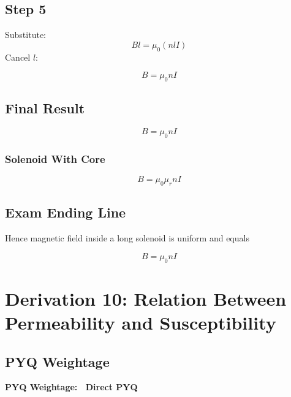 \documentclass[11pt,a4paper]{article}
\begin{document}
\subsection*{Step 5}
Substitute:
\[ Bl = \mu_0(nlI) \]
Cancel \( l \):
\begin{tcolorbox}[colback=RoyalBlue!5!white, colframe=RoyalBlue]
    \[ B = \mu_0 nI \]
\end{tcolorbox}

\subsection*{Final Result}
\begin{tcolorbox}[colback=RoyalBlue!5!white, colframe=RoyalBlue]
    \[ B = \mu_0 nI \]
\end{tcolorbox}

\subsubsection*{Solenoid With Core}
\begin{tcolorbox}[colback=RoyalBlue!5!white, colframe=RoyalBlue]
    \[ B = \mu_0 \mu_r nI \]
\end{tcolorbox}

\subsection*{Exam Ending Line}
Hence magnetic field inside a long solenoid is uniform and equals
\begin{tcolorbox}[colback=RoyalBlue!5!white, colframe=RoyalBlue]
    \[ B = \mu_0 nI \]
\end{tcolorbox}

\newpage

\section{Derivation 10: Relation Between Permeability and Susceptibility}

\subsection*{PYQ Weightage}
\begin{tcolorbox}[colback=yellow!10!white, colframe=orange, halign=center]
    \textbf{PYQ Weightage: \textasteriskcentered\textasteriskcentered\textasteriskcentered\textasteriskcentered\ Direct PYQ}
\end{tcolorbox}
\end{document}

